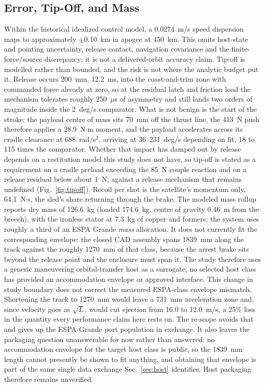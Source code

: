 \documentclass[conference]{IEEEtran}
\begin{document}
\subsection{Error, Tip-Off, and Mass}
Within the historical idealized control model, a 0.0274~m/s speed dispersion maps to approximately $\pm$0.10~km in apogee at 450~km. This omits host-state and pointing uncertainty, release contact, navigation covariance and the finite-force/source discrepancy; it is not a delivered-orbit accuracy claim. Tip-off is modelled rather than bounded, and the risk is not where the analytic budget put it. Release occurs 200~mm, 12.2~ms, into the coast-and-trim zone with commanded force already at zero, so at the residual latch and friction load the mechanism tolerates roughly 250~$\mu$s of asymmetry and still lands two orders of magnitude inside the 2~deg/s comparator. What is not benign is the start of the stroke: the payload centre of mass sits 70~mm off the thrust line, the 413~N push therefore applies a 28.9~N$\cdot$m moment, and the payload accelerates across its cradle clearance at 688~rad/s$^2$, arriving at 36--231~deg/s depending on fit, 18 to 115 times the comparator. Whether that impact has damped out by release depends on a restitution model this study does not have, so tip-off is stated as a requirement on a cradle preload exceeding the 85~N couple reaction and on a release residual below about 1~N, against a release mechanism that remains undefined (Fig.~\ref{fig:tipoff}). Recoil per shot is the satellite's momentum only, 64.1~N$\cdot$s, the sled's share returning through the brake. The modeled mass rollup reports dry mass of 126.6~kg (loaded 174.6~kg, centre of gravity 0.46~m from the breech), with the ironless stator at 7.3~kg of copper and formers; the system uses roughly a third of an ESPA Grande \emph{mass} allocation. It does not currently fit the corresponding envelope: the closed CAD assembly spans 1839~mm along the track against the roughly 1270~mm of that class, because the arrest brake sits beyond the release point and the enclosure must span it. The study therefore uses a generic maneuvering orbital-transfer host as a surrogate; no selected host class has provided an accommodation envelope or approved interface. This change in study boundary does not correct the measured ESPA-class envelope mismatch. Shortening the track to 1270~mm would leave a 731~mm acceleration zone and, since velocity goes as $\sqrt{L}$, would cut ejection from 16.0 to 12.0~m/s, a 25\% loss in the quantity every performance claim here rests on. The re-scope avoids that and gives up the ESPA-Grande port population in exchange. It also leaves the packaging question unanswerable for now rather than answered: no accommodation envelope for the target host class is public, so the 1839~mm length cannot presently be shown to fit anything, and obtaining that envelope is part of the same single data exchange Sec.~\ref{sec:host} identifies. Host packaging therefore remains unverified.
\end{document}
